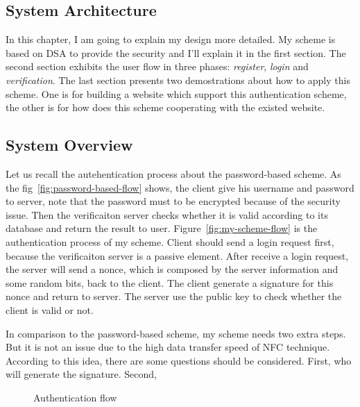 \begin{CJK}{Bg5}{bsmi}


\chapter{System Architecture}

In this chapter, I am going to explain my design more detailed. My scheme is based on DSA to provide the security and I'll explain it in the first section. The second section exhibits the user flow in three phases: \emph{register}, \emph{login} and \emph{verification}. The last section presents two demostrations about how to apply this scheme. One is for building a website which support this authentication scheme, the other is for how does this scheme cooperating with the existed website.

\section{System Overview}

Let us recall the autehentication process about the password-based scheme. As the fig~\ref{fig:password-based-flow} shows, the client give his username and password to server, note that the password must to be encrypted because of the security issue. Then the verificaiton server checks whether it is valid according to its database and return the result to user. Figure~\ref{fig:my-scheme-flow} is the authentication process of my scheme. Client should send a login request first, because the verificaiton server is a passive element. After receive a login request, the server will send a nonce, which is composed by the server information and some random bits, back to the client. The client generate a signature for this nonce and return to server. The server use the public key to check whether the client is valid or not.

In comparison to the password-based scheme, my scheme needs two extra steps. But it is not an issue due to the high data transfer speed of NFC technique. According to this idea, there are some questions should be considered. First, who will generate the signature. Second, 

\begin{figure}
\centering
{}
\caption{Authentication flow}
\end{figure}


\end{CJK}
